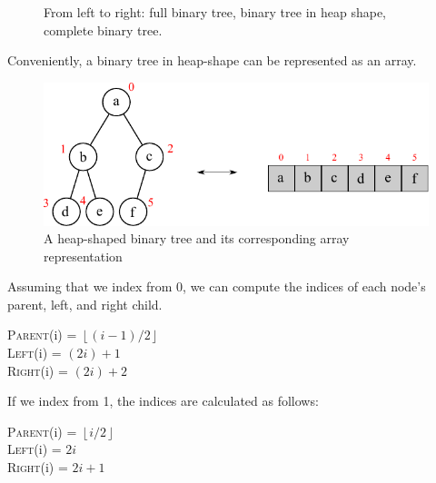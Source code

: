 \begin{figure}[h!]
    \centering
    \hfil
    \vcenteredhbox{
        \begin{tikzpicture}
            \Tree [.{} [.{} {} {} ]
            [.{} {} {} ] ]
        \end{tikzpicture}
    }
    \hfil
    \caption{From left to right: full binary tree, binary tree in heap shape, complete binary tree.}
\end{figure}

Conveniently, a binary tree in heap-shape can be represented as an array.

\begin{figure}[htbp]
    \centering
    \includegraphics[width=0.6\linewidth]{figures/heap_as_arr.pdf}
    \caption{A heap-shaped binary tree and its corresponding array representation}
\end{figure}

Assuming that we index from 0, we can compute the indices of each node's parent, left, and right child.

\textsc{Parent}(i) = $\left\lfloor (i-1) / 2 \right\rfloor$ \\
\textsc{Left}(i) = $(2i)+1$ \\
\textsc{Right}(i) = $(2i)+2$

If we index from 1, the indices are calculated as follows:

\textsc{Parent}(i) = $\left\lfloor i / 2 \right\rfloor$ \\
\textsc{Left}(i) = $2i$ \\
\textsc{Right}(i) = $2i+1$

